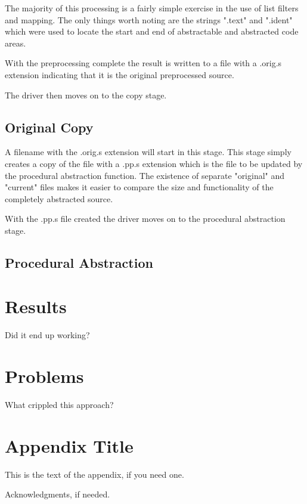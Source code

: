 \documentclass[9pt,nocopyrightspace]{sigplanconf}
\begin{document}
The majority of this processing is a fairly simple exercise in the use of list filters and mapping.
The only things worth noting are the strings ".text" and ".ident" which were used to locate the start and end of abstractable and abstracted code areas.

With the preprocessing complete the result is written to a file with a .orig.s extension indicating that it is the original preprocessed source.

The driver then moves on to the copy stage.

\subsection{Original Copy}

A filename with the .orig.s extension will start in this stage.
This stage simply creates a copy of the file with a .pp.s extension which is the file to be updated by the procedural abstraction function.
The existence of separate "original" and "current" files makes it easier to compare the size and functionality of the completely abstracted source.

With the .pp.s file created the driver moves on to the procedural abstraction stage.

\subsection{Procedural Abstraction}

\section{Results}

Did it end up working?

\section{Problems}

What crippled this approach?


\appendix
\section{Appendix Title}

This is the text of the appendix, if you need one.

\acks

Acknowledgments, if needed.

\end{document}
